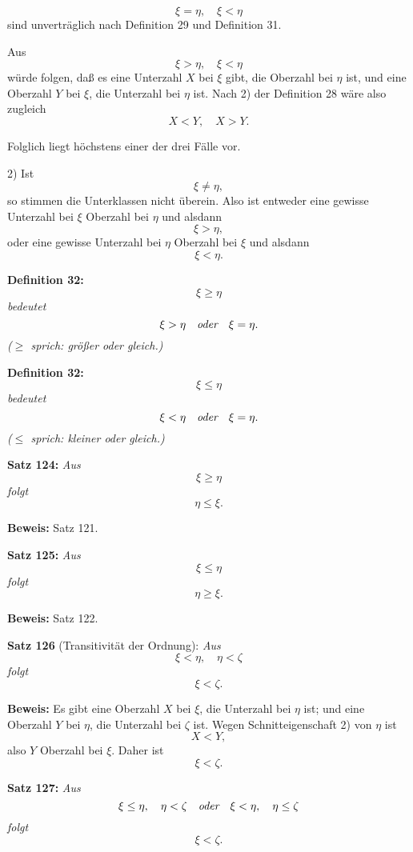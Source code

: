 $$\xi = \eta,\quad \xi < \eta$$
sind unvertr\"aglich nach Definition 29 und Definition 31.

Aus
$$\xi > \eta,\quad \xi < \eta$$
w\"urde folgen, da{\ss} es eine Unterzahl $X$ bei $\xi$ gibt, die Oberzahl
bei $\eta$ ist, und eine Oberzahl $Y$ bei $\xi$, die Unterzahl bei $\eta$ ist.
Nach 2) der Definition 28 w\"are also zugleich
$$X < Y,\quad X > Y.$$

Folglich liegt h\"ochstens einer der drei F\"alle vor.

2) Ist
$$\xi \ne \eta,$$
so stimmen die Unterklassen nicht \"uberein.  Also ist entweder eine
gewisse Unterzahl bei $\xi$ Oberzahl bei $\eta$ und alsdann
$$\xi > \eta,$$
oder eine gewisse Unterzahl bei $\eta$ Oberzahl bei $\xi$ und alsdann
$$\xi < \eta.$$
\medskip


{\bf Definition 32:} {\it $$\xi \ge \eta$$
bedeutet
$$\xi > \eta\quad\hbox{\it oder}\quad \xi = \eta.$$
{\rm ($\ge$ sprich: gr\"o{\ss}er oder gleich.)}}
\medskip


{\bf Definition 32:} {\it $$\xi \le \eta$$
bedeutet
$$\xi < \eta\quad\hbox{\it oder}\quad \xi = \eta.$$
{\rm ($\le$ sprich: kleiner oder gleich.)}}
\medskip


{\bf Satz 124:} {\it Aus
$$\xi \ge \eta$$
folgt
$$\eta \le \xi.$$}%

{\bf Beweis:} Satz 121.
\medskip


{\bf Satz 125:} {\it Aus
$$\xi \le \eta$$
folgt
$$\eta \ge \xi.$$}%

{\bf Beweis:} Satz 122.
\medskip


{\bf Satz 126} (Transitivit\"at der Ordnung): {\it Aus
$$\xi < \eta,\quad \eta < \zeta$$
folgt
$$\xi < \zeta.$$}%

{\bf Beweis:} Es gibt eine Oberzahl $X$ bei $\xi$, die Unterzahl bei $\eta$
ist; und eine Oberzahl $Y$ bei $\eta$, die Unterzahl bei $\zeta$ ist.  Wegen
Schnitteigenschaft 2) von $\eta$ ist
$$X < Y,$$
also $Y$ Oberzahl bei $\xi$.  Daher ist
$$\xi < \zeta.$$
\medskip


{\bf Satz 127:} {\it Aus
$$\xi \le \eta,\quad \eta < \zeta\quad\hbox{\it oder}\quad \xi < \eta,\quad \eta \le \zeta$$
folgt
$$\xi < \zeta.$$}%

